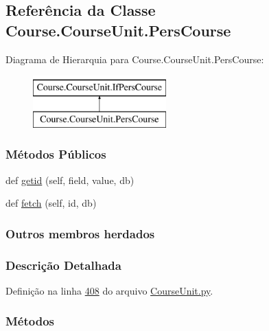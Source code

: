 \hypertarget{classCourse_1_1CourseUnit_1_1PersCourse}{}\subsection{Referência da Classe Course.\+Course\+Unit.\+Pers\+Course}
\label{classCourse_1_1CourseUnit_1_1PersCourse}
Diagrama de Hierarquia para Course.\+Course\+Unit.\+Pers\+Course\+:\begin{figure}[H]
\begin{center}
\leavevmode
\includegraphics[height=2.000000cm]{d1/d75/classCourse_1_1CourseUnit_1_1PersCourse}
\end{center}
\end{figure}
\subsubsection*{Métodos Públicos}
\begin{DoxyCompactItemize}
\item 
def \hyperlink{classCourse_1_1CourseUnit_1_1PersCourse_acfe23f8591380715d02d815193b30ca5}{getid} (self, field, value, db)
\item 
def \hyperlink{classCourse_1_1CourseUnit_1_1PersCourse_ad80c75d03ace40dd77b2e7a8b9964dd9}{fetch} (self, id, db)
\end{DoxyCompactItemize}
\subsubsection*{Outros membros herdados}


\subsubsection{Descrição Detalhada}


Definição na linha \hyperlink{CourseUnit_8py_source_l00408}{408} do arquivo \hyperlink{CourseUnit_8py_source}{Course\+Unit.\+py}.



\subsubsection{Métodos}
\hypertarget{classCourse_1_1CourseUnit_1_1PersCourse_ad80c75d03ace40dd77b2e7a8b9964dd9}{}
